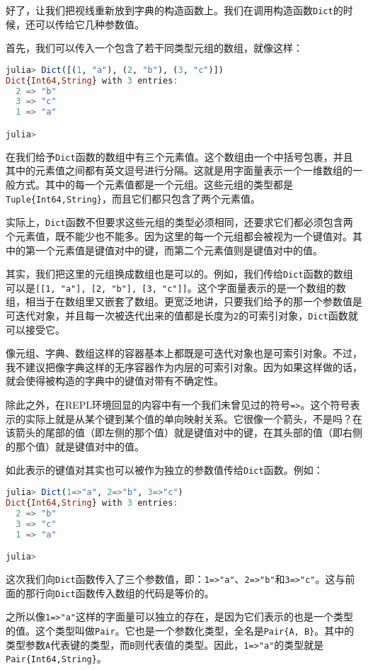 好了，让我们把视线重新放到字典的构造函数上。我们在调用构造函数\verb`Dict`的时候，还可以传给它几种参数值。

首先，我们可以传入一个包含了若干同类型元组的数组，就像这样：
\begin{lstlisting}[language=julia]
julia> Dict([(1, "a"), (2, "b"), (3, "c")])
Dict{Int64,String} with 3 entries:
  2 => "b"
  3 => "c"
  1 => "a"

julia> 
\end{lstlisting}

在我们给予\verb`Dict`函数的数组中有三个元素值。这个数组由一个中括号包裹，并且其中的元素值之间都有英文逗号进行分隔。这就是用字面量表示一个一维数组的一般方式。其中的每一个元素值都是一个元组。这些元组的类型都是\verb`Tuple{Int64,String}`，而且它们都只包含了两个元素值。

实际上，\verb`Dict`函数不但要求这些元组的类型必须相同，还要求它们都必须包含两个元素值，既不能少也不能多。因为这里的每一个元组都会被视为一个键值对。其中的第一个元素值是键值对中的键，而第二个元素值则是键值对中的值。

其实，我们把这里的元组换成数组也是可以的。例如，我们传给\verb`Dict`函数的数组可以是\verb`[[1, "a"], [2, "b"], [3, "c"]]`。这个字面量表示的是一个数组的数组，相当于在数组里又嵌套了数组。更宽泛地讲，只要我们给予的那一个参数值是可迭代对象，并且每一次被迭代出来的值都是长度为\verb`2`的可索引对象，\verb`Dict`函数就可以接受它。

像元组、字典、数组这样的容器基本上都既是可迭代对象也是可索引对象。不过，我不建议把像字典这样的无序容器作为内层的可索引对象。因为如果这样做的话，就会使得被构造的字典中的键值对带有不确定性。

除此之外，在REPL环境回显的内容中有一个我们未曾见过的符号\verb`=>`。这个符号表示的实际上就是从某个键到某个值的单向映射关系。它很像一个箭头，不是吗？在该箭头的尾部的值（即左侧的那个值）就是键值对中的键，在其头部的值（即右侧的那个值）就是键值对中的值。

如此表示的键值对其实也可以被作为独立的参数值传给\verb`Dict`函数。例如：
\begin{lstlisting}[language=julia]
julia> Dict(1=>"a", 2=>"b", 3=>"c")
Dict{Int64,String} with 3 entries:
  2 => "b"
  3 => "c"
  1 => "a"

julia> 
\end{lstlisting}

这次我们向\verb`Dict`函数传入了三个参数值，即：\verb`1=>"a"`、\verb`2=>"b"`和\verb`3=>"c"`。这与前面的那行向\verb`Dict`函数传入数组的代码是等价的。

之所以像\verb`1=>"a"`这样的字面量可以独立的存在，是因为它们表示的也是一个类型的值。这个类型叫做\verb`Pair`。它也是一个参数化类型，全名是\verb`Pair{A, B}`。其中的类型参数\verb`A`代表键的类型，而\verb`B`则代表值的类型。因此，\verb`1=>"a"`的类型就是\verb`Pair{Int64,String}`。

